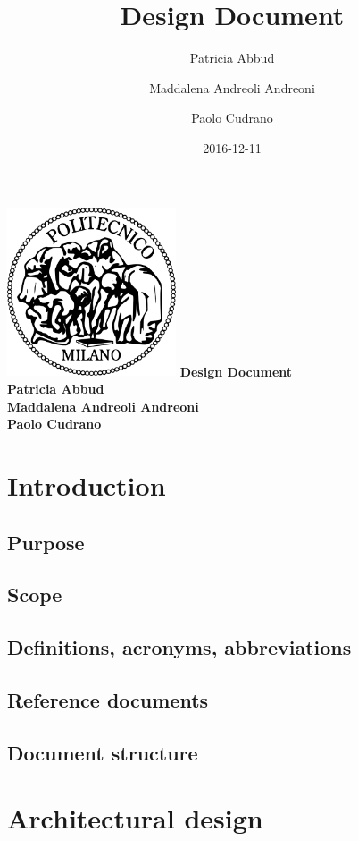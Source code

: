 \documentclass[12pt, a4paper]{article}
\title{Design Document}
\date{2016-12-11}
\author{
	Patricia Abbud
	\and
	Maddalena Andreoli Andreoni
	\and
	Paolo Cudrano
}
\begin{document}
	\begin{titlepage}
		\centering
		\includegraphics[width=5cm]{img/polimi_logo.png} %
		\vfill
		{\bfseries\Large
			Design Document\\
			\vskip4cm
			Patricia Abbud\\
			Maddalena Andreoli Andreoni\\
			Paolo Cudrano\\
		}
		\vfill
		\vfill
	\end{titlepage}

	\tableofcontents
	\newpage

	\section{Introduction}
		\subsection{Purpose}

		\subsection{Scope}

		\subsection{Definitions, acronyms, abbreviations}

		\subsection{Reference documents}

		\subsection{Document structure}

	\newpage
	\section{Architectural design}
\end{document}
